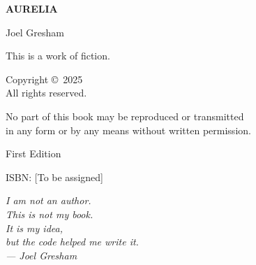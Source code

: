 \documentclass[12pt,twoside,openright]{book}
\begin{document}

\frontmatter

\thispagestyle{empty}
\begin{center}
    \vspace*{4cm}

    {\Huge\sffamily\bfseries AURELIA}

    \vfill

    {\Large\sffamily Joel Gresham}

    \vspace{2cm}

\end{center}

\cleardoublepage

\thispagestyle{empty}
\vspace*{\fill}
\begin{center}
{\small
This is a work of fiction.\\[0.5em]

\vspace{1cm}

Copyright \copyright\ 2025\\[0.5em]
All rights reserved.\\[0.5em]

\vspace{1cm}

No part of this book may be reproduced or transmitted\\
in any form or by any means without written permission.\\[0.5em]

\vspace{1cm}

First Edition\\[0.5em]

\vspace{1cm}

ISBN: [To be assigned]
}
\end{center}
\vspace*{\fill}

\cleardoublepage

\thispagestyle{empty}
\vspace*{5cm}
\begin{center}
\itshape
I am not an author.\\[1em]
This is not my book.\\[1em]
It is my idea,\\
but the code helped me write it.\\[2em]
\normalfont
--- Joel Gresham
\end{center}
\end{document}
